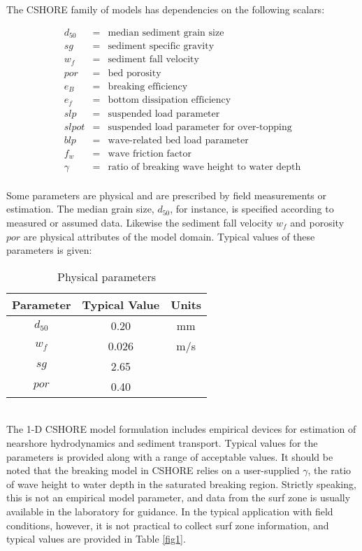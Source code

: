 \documentclass[11pt,oneside]{book}
\begin{document}
\noindent The CSHORE family of models has dependencies on the following scalars:

\begin{eqnarray}
d_{50} &=& \mbox{median sediment grain size }\nonumber \\
sg &=& \mbox{sediment specific gravity} \nonumber \\
w_f  &=& \mbox{sediment fall velocity}\nonumber \\
por &=& \mbox{bed porosity}\nonumber \\
e_B &=& \mbox{breaking efficiency} \nonumber \\
e_f &=& \mbox{bottom dissipation efficiency}\nonumber \\
slp &=& \mbox{suspended load parameter}\nonumber \\  
slpot &=& \mbox{suspended load parameter for over-topping}\nonumber \\  
blp &=& \mbox{wave-related bed load parameter}\nonumber \\  
f_w &=& \mbox{wave friction factor} \nonumber\\
\gamma &=& \mbox{ratio of breaking wave height to water depth} \nonumber
\end{eqnarray}
\\ Some parameters are physical and
are prescribed by field measurements or estimation.  The median grain
size, $d_{50}$, for instance, is specified according to measured or
assumed data.  Likewise the sediment fall velocity $w_f$ and porosity
$por$ are physical attributes of the model domain.  Typical values of
these parameters is given:
\begin{table}[h]
\begin{center}
\begin{tabular}{||c|c|c||}\hline
Parameter& Typical Value   & Units  \\ \hline \hline
$d_{50}$ & 0.20 & mm \\ \hline
$w_f$ & 0.026 & m/s \\ \hline
$sg$ & 2.65 &  \\ \hline
$por$ & 0.40 &  \\ \hline
\end{tabular}
\end{center}
\caption{Physical parameters}
\end{table}
\clearpage
{}\\ The 1-D CSHORE model
formulation includes empirical devices for estimation of nearshore
hydrodynamics and sediment transport.  Typical values for the
parameters is provided along with a range of acceptable values.  It
should be noted that the breaking model in CSHORE relies on a
user-supplied $\gamma$, the ratio of wave height to water depth in the
saturated breaking region.  Strictly speaking, this is not an
empirical model parameter, and data from the surf zone is usually
available in the laboratory for guidance.  In the typical application
with field conditions, however, it is not practical to collect surf
zone information, and typical values are provided in Table \ref{fig1}.
\end{document}
